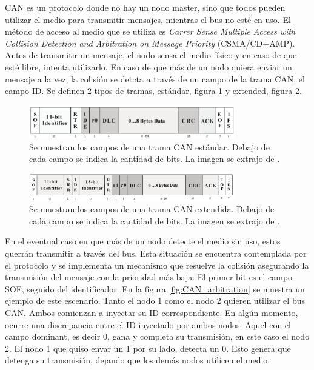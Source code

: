 CAN es un protocolo donde no hay un nodo master, sino que todos pueden utilizar el medio para transmitir mensajes, mientras el bus no esté en uso. El método de acceso al medio que se utiliza es \textit{Carrer Sense Multiple Access with Collision Detection and Arbitration on Message Priority} (CSMA/CD+AMP). Antes de transmitir un mensaje, el nodo sensa el medio físico y en caso de que esté libre, intenta utilizarlo. En caso de que más de un nodo quiera enviar un mensaje a la vez, la colisión se detcta a través de un campo de la trama CAN, el campo ID. Se definen 2 tipos de tramas, estándar, figura \ref{fig:CAN_frame_standard} y extended, figura \ref{fig:CAN_frame_extended}.

\begin{figure}[H]
    \centering
    \includegraphics[width=0.8\textwidth]{img/CAN_frame_standard.png}
    \caption{Se muestran los campos de una trama CAN estándar. Debajo de cada campo se indica la cantidad de bits. La imagen se extrajo de \cite{texasSLOA101B}.}
    \label{fig:CAN_frame_standard}
\end{figure}


\begin{figure}[H]
    \centering
    \includegraphics[width=0.8\textwidth]{img/CAN_frame_extended.png}
    \caption{Se muestran los campos de una trama CAN extendida. Debajo de cada campo se indica la cantidad de bits. La imagen se extrajo de \cite{texasSLOA101B}.}
    \label{fig:CAN_frame_extended}
\end{figure}

En el eventual caso en que más de un nodo detecte el medio sin uso, estos querrán transmitir a través del bus. Esta situación se encuentra contemplada por el protocolo y se implementa un mecanismo que resuelve la colisión asegurando la transmisión del mensaje con la prioridad más baja. El primer bit es el campo SOF, seguido del identificador. En la figura \ref{fig:CAN_arbitration} se muestra un ejemplo de este escenario. Tanto el nodo 1 como el nodo 2 quieren utilizar el bus CAN. Ambos comienzan a inyectar su ID correspondiente. En algún momento, ocurre una discrepancia entre el ID inyectado por ambos nodos. Aquel con el campo dominant, es decir 0, gana y completa su transmisión, en este caso el nodo 2. El nodo 1 que quiso envar un 1 por su lado, detecta un 0. Esto genera que detenga su transmisión, dejando que los demás nodos utilicen el medio.

